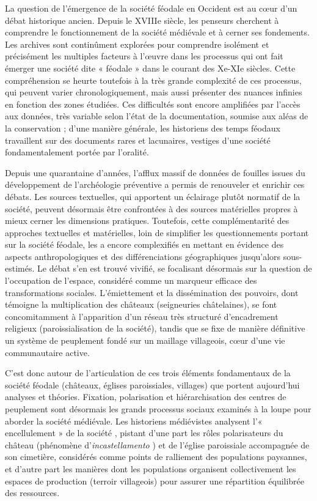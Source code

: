 La question de l'émergence de la société féodale en Occident est au cœur d'un débat historique ancien.
Depuis le XVIIIe siècle, les penseurs cherchent à comprendre le fonctionnement de la société médiévale et à cerner ses fondements.
Les archives sont continûment explorées pour comprendre isolément et précisément les multiples facteurs à l'œuvre dans les processus qui ont fait émerger une société dite « féodale » dans le courant des Xe-XIe siècles.
Cette compréhension se heurte toutefois à la très grande complexité de ces processus, qui peuvent varier chronologiquement, mais aussi présenter des nuances infinies en fonction des zones étudiées.
Ces difficultés sont encore amplifiées par l'accès aux données, très variable selon l'état de la documentation, soumise aux aléas de la conservation ; d'une manière générale, les historiens des temps féodaux travaillent sur des documents rares et lacunaires, vestiges d'une société fondamentalement portée par l'oralité.

Depuis une quarantaine d'années, l'afflux massif de données de fouilles issues du développement de l'archéologie préventive a permis de renouveler et enrichir ces débats.
Les sources textuelles, qui apportent un éclairage plutôt normatif de la société, peuvent désormais être confrontées à des sources matérielles propres à mieux cerner les dimensions pratiques.
Toutefois, cette complémentarité des approches textuelles et matérielles, loin de simplifier les questionnements portant sur la société féodale, les a encore complexifiés en mettant en évidence des aspects anthropologiques et des différenciations géographiques jusqu'alors sous-estimés.
Le débat s'en est trouvé vivifié, se focalisant désormais sur la question de l'occupation de l'espace, considéré comme un marqueur efficace des transformations sociales.
L'émiettement et la dissémination des pouvoirs, dont témoigne la multiplication des châteaux (seigneuries châtelaines), se font concomitamment à l'apparition d'un réseau très structuré d'encadrement religieux (paroissialisation de la société), tandis que se fixe de manière définitive un système de peuplement fondé sur un maillage villageois, cœur d'une vie communautaire active.

C'est donc autour de l'articulation de ces trois éléments fondamentaux de la société féodale (châteaux, églises paroissiales, villages) que portent aujourd'hui analyses et théories.
Fixation, polarisation et hiérarchisation des centres de peuplement sont désormais les grands processus sociaux examinés à la loupe pour aborder la société médiévale.
Les historiens médiévistes analysent l'« encellulement » de la société \autocite{fossier_enfance_1982}, pistant d'une part les rôles polarisateurs du château (phénomène d'\textit{incastellamento} \autocite{toubert_les_1973}) et de l'église paroissiale accompagnée de son cimetière, considérés comme points de ralliement des populations paysannes, et d'autre part les manières dont les populations organisent collectivement les espaces de production (terroir villageois) pour assurer une répartition équilibrée des ressources.

